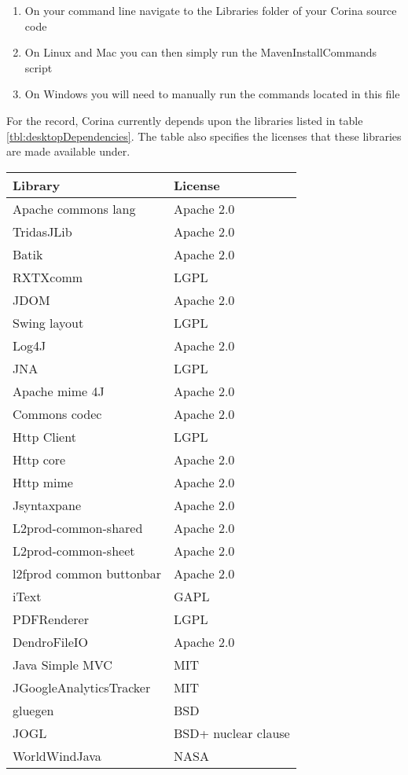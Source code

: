 \begin{enumerate}
 \item On your command line navigate to the Libraries folder of your Corina source code
 \item On Linux and Mac you can then simply run the MavenInstallCommands script
 \item On Windows you will need to manually run the commands located in this file
\end{enumerate}

For the record, Corina currently depends upon the libraries listed in table \ref{tbl:desktopDependencies}.  The table also specifies the licenses that these libraries are made available under.


\begin{table*}[htbp]
\centering
{}
\begin{tabular*}{0.6\textwidth}{ll}
\toprule
Library & License \\
\midrule
Apache commons lang & Apache 2.0 \\
TridasJLib & Apache 2.0 \\
Batik & Apache 2.0 \\ 
RXTXcomm & LGPL\\
JDOM & Apache 2.0\\
Swing layout & LGPL\\
Log4J & Apache 2.0\\
JNA & LGPL\\
Apache mime 4J & Apache 2.0\\
Commons codec & Apache 2.0\\
Http Client &LGPL\\
Http core & Apache 2.0\\
Http mime &Apache 2.0\\
Jsyntaxpane & Apache 2.0\\
L2prod-common-shared &Apache 2.0\\
L2prod-common-sheet &Apache 2.0\\
l2fprod common buttonbar &Apache 2.0\\
iText &GAPL\\
PDFRenderer & LGPL\\
DendroFileIO & Apache 2.0\\
Java Simple MVC & MIT\\
JGoogleAnalyticsTracker & MIT\\
gluegen & BSD\\
JOGL & BSD+ nuclear clause\\
WorldWindJava & NASA \\

\end{tabular*}
\end{table*}
